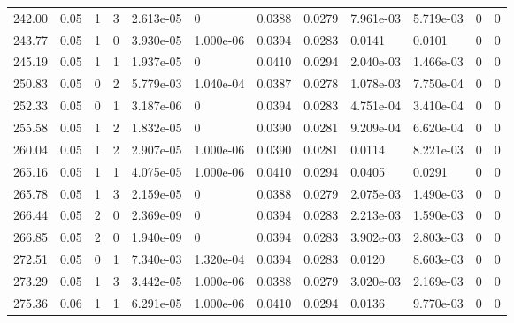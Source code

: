 \documentclass[preview]{standalone}
\begin{document}
{{{\begin{tabular}{L{1.2cm}C{1.2cm} C{0.3cm}C{0.5cm} C{1.4cm}C{1.4cm} C{1.4cm}C{1.4cm} C{1.6cm}C{1.6cm} C{1.6cm}C{1.6cm}}
  242.00  &  0.05  & 1     &  3 &  2.613e-05  & 0  &  0.0388&   0.0279& 7.961e-03 & 5.719e-03   &  0 & 0  \\ 
  243.77  &  0.05  & 1     &  0 &  3.930e-05  & 1.000e-06  &  0.0394&   0.0283& 0.0141 & 0.0101   &  0 & 0  \\ 
  245.19  &  0.05  & 1     &  1 &  1.937e-05  & 0  &  0.0410&   0.0294& 2.040e-03 & 1.466e-03   &  0 & 0  \\ 
  250.83  &  0.05  & 0     &  2 &  5.779e-03  & 1.040e-04  &  0.0387&   0.0278& 1.078e-03 & 7.750e-04   &  0 & 0  \\ 
  252.33  &  0.05  & 0     &  1 &  3.187e-06  & 0  &  0.0394&   0.0283& 4.751e-04 & 3.410e-04   &  0 & 0  \\ 
  255.58  &  0.05  & 1     &  2 &  1.832e-05  & 0  &  0.0390&   0.0281& 9.209e-04 & 6.620e-04   &  0 & 0  \\ 
  260.04  &  0.05  & 1     &  2 &  2.907e-05  & 1.000e-06  &  0.0390&   0.0281& 0.0114 & 8.221e-03   &  0 & 0  \\ 
  265.16  &  0.05  & 1     &  1 &  4.075e-05  & 1.000e-06  &  0.0410&   0.0294& 0.0405 & 0.0291   &  0 & 0  \\ 
  265.78  &  0.05  & 1     &  3 &  2.159e-05  & 0  &  0.0388&   0.0279& 2.075e-03 & 1.490e-03   &  0 & 0  \\ 
  266.44  &  0.05  & 2     &  0 &  2.369e-09  & 0  &  0.0394&   0.0283& 2.213e-03 & 1.590e-03   &  0 & 0  \\ 
  266.85  &  0.05  & 2     &  0 &  1.940e-09  & 0  &  0.0394&   0.0283& 3.902e-03 & 2.803e-03   &  0 & 0  \\ 
  272.51  &  0.05  & 0     &  1 &  7.340e-03  & 1.320e-04  &  0.0394&   0.0283& 0.0120 & 8.603e-03   &  0 & 0  \\ 
  273.29  &  0.05  & 1     &  3 &  3.442e-05  & 1.000e-06  &  0.0388&   0.0279& 3.020e-03 & 2.169e-03   &  0 & 0  \\ 
  275.36  &  0.06  & 1     &  1 &  6.291e-05  & 1.000e-06  &  0.0410&   0.0294& 0.0136 & 9.770e-03   &  0 & 0  \\ 
\hline 
\end{tabular} 

}}}
\end{document}
